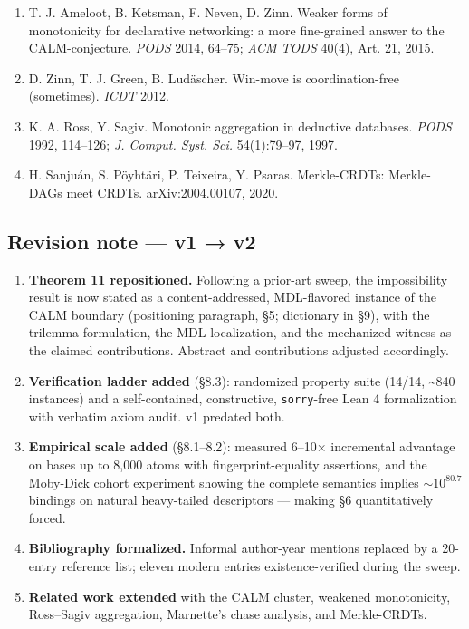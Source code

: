 \documentclass[
  10pt,
]{article}
\providecommand{\tightlist}{%
  \setlength{\itemsep}{0pt}\setlength{\parskip}{0pt}}
\begin{document}
\begin{enumerate}
  J. M. Hellerstein, P. Alvaro. Keeping CALM: when distributed
  consistency is easy. \emph{Commun. ACM} 63(9), 2020.
\item
  T. J. Ameloot, B. Ketsman, F. Neven, D. Zinn. Weaker forms of
  monotonicity for declarative networking: a more fine-grained answer to
  the CALM-conjecture. \emph{PODS} 2014, 64--75; \emph{ACM TODS} 40(4),
  Art. 21, 2015.
\item
  D. Zinn, T. J. Green, B. Ludäscher. Win-move is coordination-free
  (sometimes). \emph{ICDT} 2012.
\item
  K. A. Ross, Y. Sagiv. Monotonic aggregation in deductive databases.
  \emph{PODS} 1992, 114--126; \emph{J. Comput. Syst. Sci.} 54(1):79--97,
  1997.
\item
  H. Sanjuán, S. Pöyhtäri, P. Teixeira, Y. Psaras. Merkle-CRDTs:
  Merkle-DAGs meet CRDTs. arXiv:2004.00107, 2020.
\end{enumerate}

\hypertarget{revision-note-v1-v2}{%
\subsection{Revision note --- v1 → v2}\label{revision-note-v1-v2}}

\begin{enumerate}
\def\labelenumi{\arabic{enumi}.}
\tightlist
\item
  \textbf{Theorem 11 repositioned.} Following a prior-art sweep, the
  impossibility result is now stated as a content-addressed,
  MDL-flavored instance of the CALM boundary (positioning paragraph, §5;
  dictionary in §9), with the trilemma formulation, the MDL
  localization, and the mechanized witness as the claimed contributions.
  Abstract and contributions adjusted accordingly.
\item
  \textbf{Verification ladder added} (§8.3): randomized property suite
  (14/14, \textasciitilde840 instances) and a self-contained,
  constructive, \texttt{sorry}-free Lean 4 formalization with verbatim
  axiom audit. v1 predated both.
\item
  \textbf{Empirical scale added} (§8.1--8.2): measured 6--10×
  incremental advantage on bases up to 8,000 atoms with
  fingerprint-equality assertions, and the Moby-Dick cohort experiment
  showing the complete semantics implies \(\sim\!10^{80.7}\) bindings on
  natural heavy-tailed descriptors --- making §6 quantitatively forced.
\item
  \textbf{Bibliography formalized.} Informal author-year mentions
  replaced by a 20-entry reference list; eleven modern entries
  existence-verified during the sweep.
\item
  \textbf{Related work extended} with the CALM cluster, weakened
  monotonicity, Ross--Sagiv aggregation, Marnette's chase analysis, and
  Merkle-CRDTs.
\end{enumerate}
\end{document}
